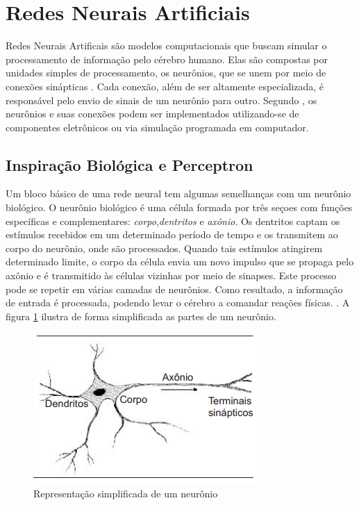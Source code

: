\section{Redes Neurais Artificiais}
Redes Neurais Artificais são modelos computacionais que buscam simular o processamento de informação pelo cérebro humano. Elas são compostas por unidades simples de processamento, os neurônios, que se unem por meio de conexões sinápticas \cite{zhang1998}. Cada conexão, além de ser altamente especializada, é responsável pelo envio de sinais de um neurônio para outro. Segundo \cite{haykin2009}, os neurônios e suas conexões podem ser implementados utilizando-se de componentes eletrônicos ou via simulação programada em computador.

\subsection{Inspiração Biológica e Perceptron}

Um bloco básico de uma rede neural tem algumas semelhanças com um neurônio biológico. O neurônio biológico é uma célula formada por três seçoes com funções específicas e complementares: \textit{corpo},\textit{dentritos} e \textit{axônio}. Os dentritos captam os estímulos recebidos em um determinado período de tempo e os transmitem ao corpo do neurônio, onde são processados. Quando tais estímulos atingirem determinado limite, o corpo da célula envia um novo impulso que se propaga pelo axônio e é transmitido às células vizinhas por meio de sinapses.  Este processo pode se repetir em várias camadas de neurônios. Como resultado, a informação de entrada é processada, podendo levar o cérebro a comandar reações físicas.  \cite{ferneda2006}. A figura \ref{fig-neuronio} ilustra de forma simplificada as partes de um neurônio.

\begin{figure}[h]
	\centering
	\includegraphics[scale=0.5]{pasta1_figuras/neuronio.png}
	\caption{Representação simplificada de um neurônio}
	\label{fig-neuronio}
\end{figure}

